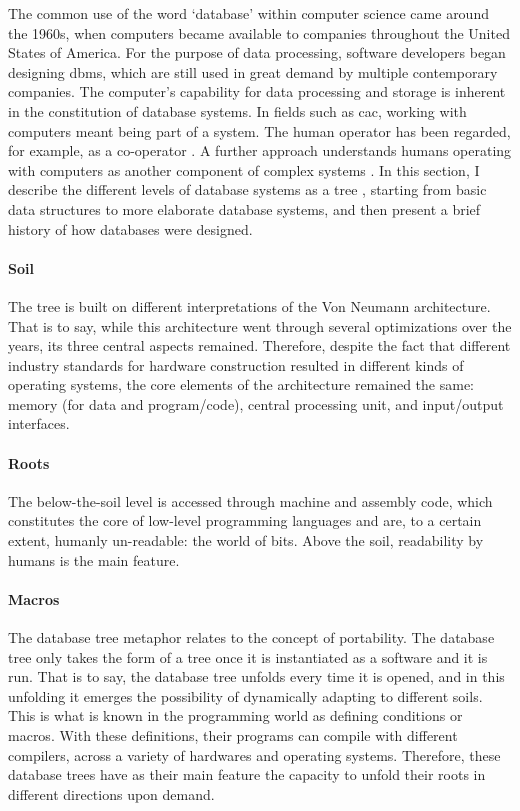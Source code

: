 The common use of the word `database' within computer science came around the 1960s, when computers became available to companies throughout the United States of America. For the purpose of data processing, software developers began designing \gls{dbms}, which are still used in great demand by multiple contemporary companies. The computer's capability for data processing and storage is inherent in the constitution of database systems. In fields such as \gls{cac}, working with computers meant being part of a system. The human operator has been regarded, for example, as a co-operator \parencite{Mat63:The}. A further approach understands humans operating with computers as another component of complex systems \parencite{Vag01:Som}. In this section, I describe the different levels of database systems as a tree , starting from basic data structures to more elaborate database systems, and then present a brief history of how databases were designed.


\paragraph{Soil}
The tree is built on different interpretations of the Von Neumann architecture. That is to say, while this architecture went through several optimizations over the years, its three central aspects remained. Therefore, despite the fact that different industry standards for hardware construction resulted in different kinds of operating systems, the core elements of the architecture remained the same: memory (for data and program/code), central processing unit, and input/output interfaces.

\paragraph{Roots}
The below-the-soil level is accessed through machine and assembly code, which constitutes the core of low-level programming languages and are, to a certain extent, humanly un-readable: the world of bits. Above the soil, readability by humans is the main feature.

\paragraph{Macros}
\label{portability}
The database tree metaphor relates to the concept of portability. The database tree only takes the form of a tree once it is instantiated as a software and it is run. That is to say, the database tree unfolds every time it is opened, and in this unfolding it emerges the possibility of dynamically adapting to different soils. This is what is known in the programming world as defining conditions or macros. With these definitions, their programs can compile with different compilers, across a variety of hardwares and operating systems. Therefore, these database trees have as their main feature the capacity to unfold their roots in different directions upon demand. 

